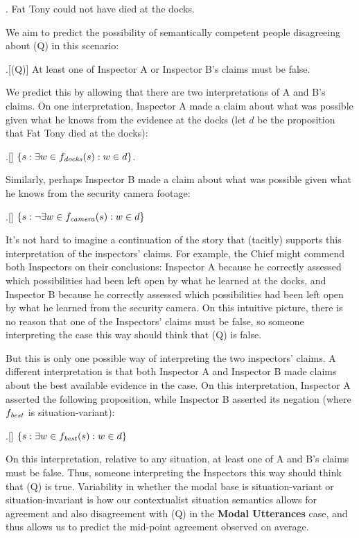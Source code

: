 \documentclass[11pt]{article}
\begin{document}
\begin{doublespace}
\ex. Fat Tony could not have died at the docks. 

We aim to predict the possibility of semantically competent people disagreeing about (Q) in this scenario:

\ex.[(Q)] At least one of Inspector A or Inspector B's claims must be false.

We predict this by allowing that there are two interpretations of A and B's claims. On one interpretation, Inspector A made a claim about what was possible given what he knows from the evidence at the docks (let $d$ be the proposition that Fat Tony died at the docks):

\ex.[] $\{s: \exists w\in f_{\it docks}(s): w\in d\}$. 

Similarly, perhaps Inspector B made a claim about what was possible given what he knows from the security camera footage:

\ex.[] $\{s: \lnot\exists w\in f_{\it camera}(s): w\in d\}$ 

It's not hard to imagine a continuation of the story that (tacitly) supports this interpretation of the inspectors' claims. For example, the Chief might commend both Inspectors on their conclusions: Inspector A because he correctly assessed which possibilities had been left open by what he learned at the docks, and Inspector B because he correctly assessed which possibilities had been left open by what he learned from the security camera. On this intuitive picture, there is no reason that one of the Inspectors' claims must be false, so someone interpreting the case this way should think that (Q) is false.

But this is only one possible way of interpreting the two inspectors' claims. A different interpretation is that both Inspector A and Inspector B made claims about the best available evidence in the case. On this interpretation, Inspector A asserted the following proposition, while Inspector B asserted its negation (where $f_{\it best}$ is situation-variant):

\ex.[] $\{s: \exists w\in f_{\it best}(s): w\in d\}$

On this interpretation, relative to any situation, at least one of A and B's claims must be false. Thus, someone interpreting the Inspectors this way should think that (Q) is true. Variability in whether the modal base is situation-variant or situation-invariant is how our contextualist situation semantics allows for agreement and also disagreement with (Q) in the {\bf Modal Utterances} case, and thus allows us to predict the mid-point agreement observed on average. 


\end{doublespace}
\end{document}
